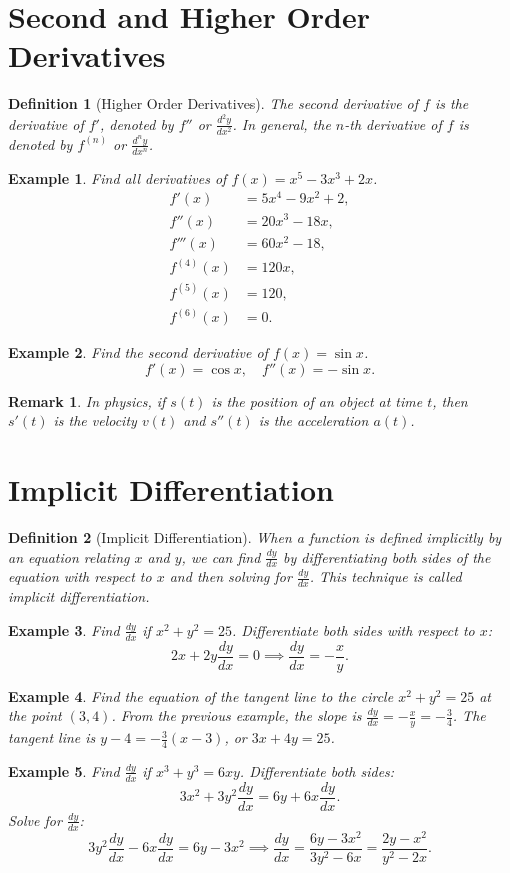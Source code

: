 \documentclass[11pt,a4paper]{article}
\newtheorem{example}{Example}
\newtheorem{definition}{Definition}
\newtheorem{remark}{Remark}
\begin{document}
\section{Second and Higher Order Derivatives}
\begin{definition}[Higher Order Derivatives]
The \textit{second derivative} of $f$ is the derivative of $f'$, denoted by $f''$ or $\frac{d^2y}{dx^2}$. In general, the \textit{$n$-th derivative} of $f$ is denoted by $f^{(n)}$ or $\frac{d^ny}{dx^n}$.
\end{definition}
\begin{example}
Find all derivatives of $f(x) = x^5 - 3x^3 + 2x$.
\begin{align*}
f'(x) &= 5x^4 - 9x^2 + 2, \\
f''(x) &= 20x^3 - 18x, \\
f'''(x) &= 60x^2 - 18, \\
f^{(4)}(x) &= 120x, \\
f^{(5)}(x) &= 120, \\
f^{(6)}(x) &= 0.
\end{align*}
\end{example}
\begin{example}
Find the second derivative of $f(x) = \sin x$.
\[
f'(x) = \cos x, \quad f''(x) = -\sin x.
\]
\end{example}
\begin{remark}
In physics, if $s(t)$ is the position of an object at time $t$, then $s'(t)$ is the velocity $v(t)$ and $s''(t)$ is the acceleration $a(t)$.
\end{remark}
\section{Implicit Differentiation}
\begin{definition}[Implicit Differentiation]
When a function is defined implicitly by an equation relating $x$ and $y$, we can find $\frac{dy}{dx}$ by differentiating both sides of the equation with respect to $x$ and then solving for $\frac{dy}{dx}$. This technique is called \textit{implicit differentiation}.
\end{definition}
\begin{example}
Find $\frac{dy}{dx}$ if $x^2 + y^2 = 25$.
Differentiate both sides with respect to $x$:
\[
2x + 2y \frac{dy}{dx} = 0 \implies \frac{dy}{dx} = -\frac{x}{y}.
\]
\end{example}
\begin{example}
Find the equation of the tangent line to the circle $x^2 + y^2 = 25$ at the point $(3, 4)$.
From the previous example, the slope is $\frac{dy}{dx} = -\frac{x}{y} = -\frac{3}{4}$.
The tangent line is $y - 4 = -\frac{3}{4}(x - 3)$, or $3x + 4y = 25$.
\end{example}
\begin{example}
Find $\frac{dy}{dx}$ if $x^3 + y^3 = 6xy$.
Differentiate both sides:
\[
3x^2 + 3y^2 \frac{dy}{dx} = 6y + 6x \frac{dy}{dx}.
\]
Solve for $\frac{dy}{dx}$:
\[
3y^2 \frac{dy}{dx} - 6x \frac{dy}{dx} = 6y - 3x^2 \implies \frac{dy}{dx} = \frac{6y - 3x^2}{3y^2 - 6x} = \frac{2y - x^2}{y^2 - 2x}.
\]
\end{example}
\end{document}

